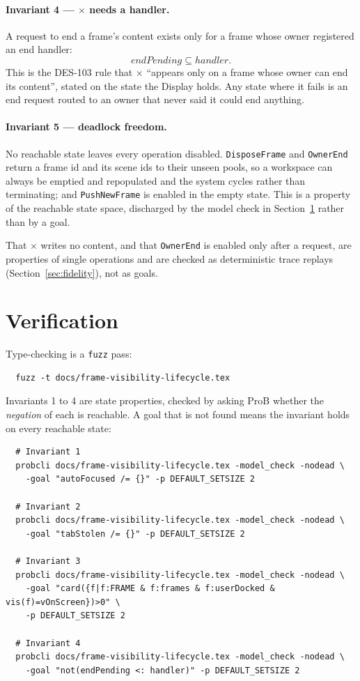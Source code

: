 \documentclass[a4paper,10pt,fleqn]{article}
\begin{document}
\paragraph{Invariant 4 --- $\times$ needs a handler.}
A request to end a frame's content exists only for a frame whose owner
registered an end handler:
\[
  endPending \subseteq handler.
\]
This is the DES-103 rule that $\times$ ``appears only on a frame whose owner
can end its content'', stated on the state the Display holds.  Any state
where it fails is an end request routed to an owner that never said it could
end anything.

\paragraph{Invariant 5 --- deadlock freedom.}
No reachable state leaves every operation disabled.  \texttt{DisposeFrame}
and \texttt{OwnerEnd} return a frame id and its scene ids to their unseen
pools, so a workspace can always be emptied and repopulated and the system
cycles rather than terminating; and \texttt{PushNewFrame} is enabled in the
empty state.  This is a property of the reachable state space, discharged by
the model check in Section~\ref{sec:verify} rather than by a goal.

That $\times$ writes no content, and that \texttt{OwnerEnd} is enabled only
after a request, are properties of single operations and are checked as
deterministic trace replays (Section~\ref{sec:fidelity}), not as goals.

\section{Verification}
\label{sec:verify}

Type-checking is a \texttt{fuzz} pass:
\begin{verbatim}
  fuzz -t docs/frame-visibility-lifecycle.tex
\end{verbatim}

Invariants 1 to 4 are state properties, checked by asking ProB whether the
\emph{negation} of each is reachable.  A goal that is not found means the
invariant holds on every reachable state:
\begin{verbatim}
  # Invariant 1
  probcli docs/frame-visibility-lifecycle.tex -model_check -nodead \
    -goal "autoFocused /= {}" -p DEFAULT_SETSIZE 2

  # Invariant 2
  probcli docs/frame-visibility-lifecycle.tex -model_check -nodead \
    -goal "tabStolen /= {}" -p DEFAULT_SETSIZE 2

  # Invariant 3
  probcli docs/frame-visibility-lifecycle.tex -model_check -nodead \
    -goal "card({f|f:FRAME & f:frames & f:userDocked & vis(f)=vOnScreen})>0" \
    -p DEFAULT_SETSIZE 2

  # Invariant 4
  probcli docs/frame-visibility-lifecycle.tex -model_check -nodead \
    -goal "not(endPending <: handler)" -p DEFAULT_SETSIZE 2
\end{verbatim}
\end{document}
